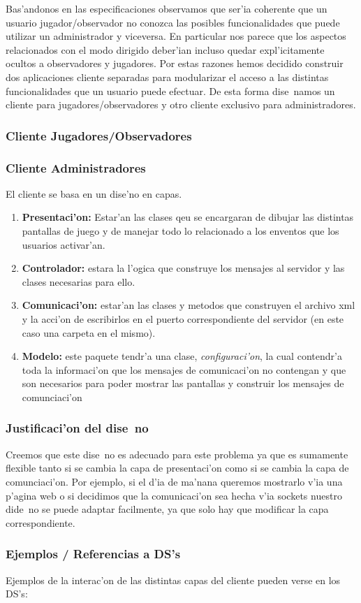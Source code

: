 Bas'andonos en las especificaciones observamos que ser'ia coherente que un usuario jugador/observador no conozca las posibles funcionalidades que puede utilizar un administrador y viceversa. En particular nos parece que los aspectos relacionados con el modo dirigido deber'ian incluso quedar expl'icitamente ocultos a observadores y jugadores. Por estas razones hemos decidido construir dos aplicaciones cliente separadas para modularizar el acceso a las distintas funcionalidades que un usuario puede efectuar. De esta forma dise~namos un cliente para jugadores/observadores y otro cliente exclusivo para administradores.

\subsubsection{Cliente Jugadores/Observadores}\label{Clientes::Jugadores/Observadores}

\subsubsection{Cliente Administradores}\label{Clientes::Administradores}

El cliente se basa en un dise'no en capas.


\begin{enumerate}
	\item \textbf{Presentaci'on: }Estar'an las clases qeu se encargaran de dibujar las distintas pantallas de juego y de manejar todo lo relacionado a los enventos que los usuarios activar'an.
	\item \textbf{Controlador: } estara la l'ogica que construye los mensajes al servidor y las clases necesarias para ello.
	\item \textbf{Comunicaci'on:} estar'an las clases y metodos que construyen el archivo xml y la acci'on de escribirlos en el puerto correspondiente del servidor (en este caso una carpeta en el mismo).
	\item  \textbf{Modelo:} este paquete tendr'a una clase, \textit{configuraci'on}, la cual contendr'a toda la informaci'on que los mensajes de comunicaci'on no contengan y que son necesarios para poder mostrar las pantallas y construir los mensajes de comunciaci'on
 \end{enumerate}

\subsubsection{Justificaci'on del dise~no}
Creemos que este dise~no es adecuado para este problema ya que es sumamente flexible tanto si se cambia la capa de presentaci'on como si se cambia la capa de comunciaci'on. Por ejemplo, si el d'ia de ma'nana queremos mostrarlo v'ia una p'agina web o si decidimos que la comunicaci'on sea hecha v'ia sockets nuestro dide~no se puede adaptar facilmente, ya que solo hay que modificar la capa correspondiente.

\subsubsection{Ejemplos / Referencias a DS's}
Ejemplos de la interac'on de las distintas capas del cliente pueden verse en los DS's:



